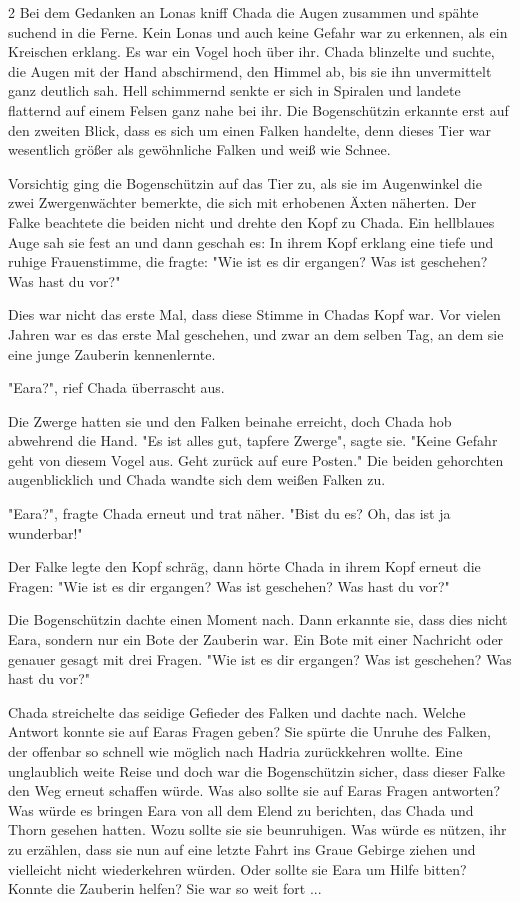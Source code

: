 \documentclass[10pt, a4paper, oneside]{book}
\begin{document}
\begin{multicols}{2}
Bei dem Gedanken an Lonas kniff Chada die Augen zusammen und spähte suchend in die Ferne. Kein Lonas und auch keine Gefahr war zu erkennen, als ein Kreischen erklang. Es war ein Vogel hoch über ihr. Chada blinzelte und suchte, die Augen mit der Hand abschirmend, den Himmel ab, bis sie ihn unvermittelt ganz deutlich sah. Hell schimmernd senkte er sich in Spiralen und landete flatternd auf einem Felsen ganz nahe bei ihr. Die Bogenschützin erkannte erst auf den zweiten Blick, dass es sich um einen Falken handelte, denn dieses Tier war wesentlich größer als gewöhnliche Falken und weiß wie Schnee.

Vorsichtig ging die Bogenschützin auf das Tier zu, als sie im Augenwinkel die zwei Zwergenwächter bemerkte, die sich mit erhobenen Äxten näherten. Der Falke beachtete die beiden nicht und drehte den Kopf zu Chada. Ein hellblaues Auge sah sie fest an und dann geschah es: In ihrem Kopf erklang eine tiefe und ruhige Frauenstimme, die fragte: "Wie ist es dir ergangen? Was ist geschehen? Was hast du vor?"

Dies war nicht das erste Mal, dass diese Stimme in Chadas Kopf war. Vor vielen Jahren war es das erste Mal geschehen, und zwar an dem selben Tag, an dem sie eine junge Zauberin kennenlernte.

"Eara?", rief Chada überrascht aus.

Die Zwerge hatten sie und den Falken beinahe erreicht, doch Chada hob abwehrend die Hand. "Es ist alles gut, tapfere Zwerge", sagte sie. "Keine Gefahr geht von diesem Vogel aus. Geht zurück auf eure Posten." Die beiden gehorchten augenblicklich und Chada wandte sich dem weißen Falken zu.

"Eara?", fragte Chada erneut und trat näher. "Bist du es? Oh, das ist ja wunderbar!"

Der Falke legte den Kopf schräg, dann hörte Chada in ihrem Kopf erneut die Fragen: "Wie ist es dir ergangen? Was ist geschehen? Was hast du vor?"

Die Bogenschützin dachte einen Moment nach. Dann erkannte sie, dass dies nicht Eara, sondern nur ein Bote der Zauberin war. Ein Bote mit einer Nachricht oder genauer gesagt mit drei Fragen. "Wie ist es dir ergangen? Was ist geschehen? Was hast du vor?"

Chada streichelte das seidige Gefieder des Falken und dachte nach. Welche Antwort konnte sie auf Earas Fragen geben? Sie spürte die Unruhe des Falken, der offenbar so schnell wie möglich nach Hadria zurückkehren wollte. Eine unglaublich weite Reise und doch war die Bogenschützin sicher, dass dieser Falke den Weg erneut schaffen würde. Was also sollte sie auf Earas Fragen antworten? Was würde es bringen Eara von all dem Elend zu berichten, das Chada und Thorn gesehen hatten. Wozu sollte sie sie beunruhigen. Was würde es nützen, ihr zu erzählen, dass sie nun auf eine letzte Fahrt ins Graue Gebirge ziehen und vielleicht nicht wiederkehren würden. Oder sollte sie Eara um Hilfe bitten? Konnte die Zauberin helfen? Sie war so weit fort ...


\end{multicols}
\end{document}
